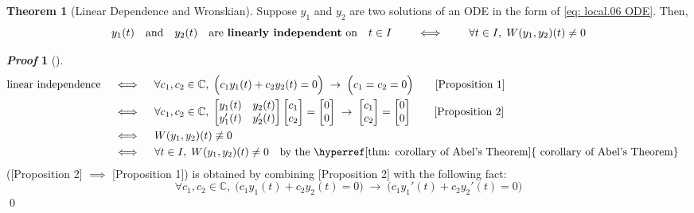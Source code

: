 \documentclass[10pt,UTF8]{article}
\newenvironment{theoremBox}
{
  \begin{tcolorbox}[colback=yellow!5!white,colframe=yellow!75!black,parbox=false,before
  upper=\par,before lower=\par]}
  {
\end{tcolorbox}}
\theoremstyle{definition}
\newtheorem{definition inner}{Definition}[section]
\theoremstyle{definition}
\newtheorem{theorem inner}{Theorem}[section]
\newenvironment{theorem}[1][]
{
  \begin{theoremBox}
  \begin{theorem inner}[#1]\hfill\par}
    {
    \end{theorem inner}
\end{theoremBox}}
\theoremstyle{definition}
\newtheorem*{proof inner}{\textit{Proof}}
\renewenvironment{proof}[1][]
{
\begin{proof inner}[#1]\hfill\par}
  {\qed\vphantom{.}
\end{proof inner}}
\theoremstyle{plain}
\newtheorem{tip inner}{Tip}[section]
\theoremstyle{remark}
\begin{document}
\begin{theorem}[Linear Dependence and Wronskian]
  {}\label{thm: linear dependence and Wronskian}
  Suppose \(y_1\) and \(y_2\) are two solutions of an ODE
  in the form of \cref{eq: local.06 ODE}. Then,
  \begin{equation*}
    y_1(t) \qand y_2(t) \qq{are \textbf{linearly independent} on}
    t \in I
    \qquad\iff\qquad
    \forall t \in I, \;
    W(y_1,y_2)(t) \neq 0
  \end{equation*}
\end{theorem}

\begin{proof}\noindent
  \begin{align*}
    \text{linear independence}
    \quad&\iff\quad
    \forall c_1, c_2 \in \mathbb{C},\;
    \Big(c_1 y_1(t) + c_2 y_2(t) = 0\Big)
    \; \to \; \Big(c_1 = c_2 = 0\Big)
    \tag*{[Proposition 1]} \\
    &\iff\quad
    \forall c_1, c_2 \in \mathbb{C},\;
    \begin{bmatrix}
      y_1(t) & y_2(t) \\
      y_1'(t) & y_2'(t)
    \end{bmatrix}
    \begin{bmatrix}
      c_1 \\ c_2
    \end{bmatrix} =
    \begin{bmatrix}
      0 \\ 0
    \end{bmatrix} \; \to \;
    \begin{bmatrix}
      c_1 \\ c_2
    \end{bmatrix} =
    \begin{bmatrix}
      0 \\ 0
    \end{bmatrix}
    \tag*{[Proposition 2]} \\
    &\iff\quad
    W(y_1,y_2)(t) \not\equiv 0 \\
    &\iff\quad
    \forall t \in I, \; W(y_1,y_2)(t) \neq 0
    \qq{by the \hyperref[thm: corollary of Abel's Theorem]{
    corollary of Abel's Theorem}}
  \end{align*}
  \big([Proposition 2] \(\implies \) [Proposition 1]\big) is obtained by
  combining [Proposition 2] with the following fact:
  \begin{equation*}
    \forall c_1, c_2 \in \mathbb{C},\;
    \Big(c_1 y_1(t) + c_2 y_2(t) = 0\Big)
    \; \to \;
    \Big(c_1 y_1'(t) + c_2 y_2'(t) = 0\Big)
  \end{equation*}
\end{proof}
\end{document}
